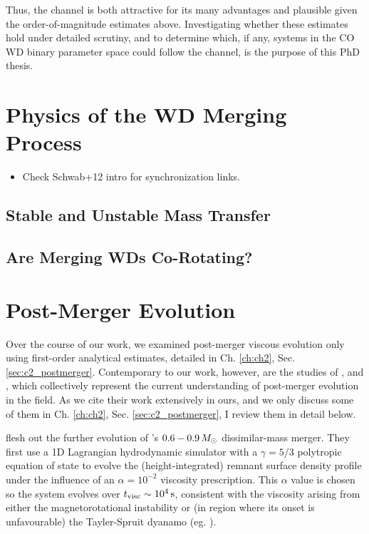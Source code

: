 Thus, the \citeal{vkercj10} channel is both attractive for its many advantages and plausible given the order-of-magnitude estimates above.  Investigating whether these estimates hold under detailed scrutiny, and to determine which, if any, systems in the CO WD binary parameter space could follow the channel, is the purpose of this PhD thesis.

\section{Physics of the WD Merging Process}

\begin{itemize}
	\item Check Schwab+12 intro for synchronization links.
\end{itemize}

\subsection{Stable and Unstable Mass Transfer}

\subsection{Are Merging WDs Co-Rotating?}

\section{Post-Merger Evolution}

Over the course of our work, we examined post-merger viscous evolution only using first-order analytical estimates, detailed in Ch. \ref{ch:ch2}, Sec. \ref{sec:c2_postmerger}.  Contemporary to our work, however, are the studies of \cite{shen+12}, \cite{schw+12} and \cite{ji+13}, which collectively represent the current understanding of post-merger evolution in the field.  As we cite their work extensively in ours, and we only discuss some of them in Ch. \ref{ch:ch2}, Sec. \ref{sec:c2_postmerger}, I review them in detail below.

\cite{shen+12} flesh out the further evolution of \cite{dan+11}'s $0.6 -0.9\,\Msun$ dissimilar-mass merger.  They first use a 1D Lagrangian hydrodynamic simulator with a $\gamma = 5/3$ polytropic equation of state to evolve the (height-integrated) remnant surface density profile under the influence of an $\alpha = 10^{-2}$ viscosity prescription.  This $\alpha$ value is chosen so the system evolves over $t_\mathrm{visc} \sim 10^{4}\,\mathrm{s}$, consistent with the viscosity arising from either the magnetorotational instability \citep{balbh91} or (in region where its onset is unfavourable) the Tayler-Spruit dyanamo (eg. \citealt{spru02}).  

